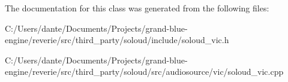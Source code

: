 The documentation for this class was generated from the following files\+:\begin{DoxyCompactItemize}
\item 
C\+:/\+Users/dante/\+Documents/\+Projects/grand-\/blue-\/engine/reverie/src/third\+\_\+party/soloud/include/soloud\+\_\+vic.\+h\item 
C\+:/\+Users/dante/\+Documents/\+Projects/grand-\/blue-\/engine/reverie/src/third\+\_\+party/soloud/src/audiosource/vic/soloud\+\_\+vic.\+cpp\end{DoxyCompactItemize}
